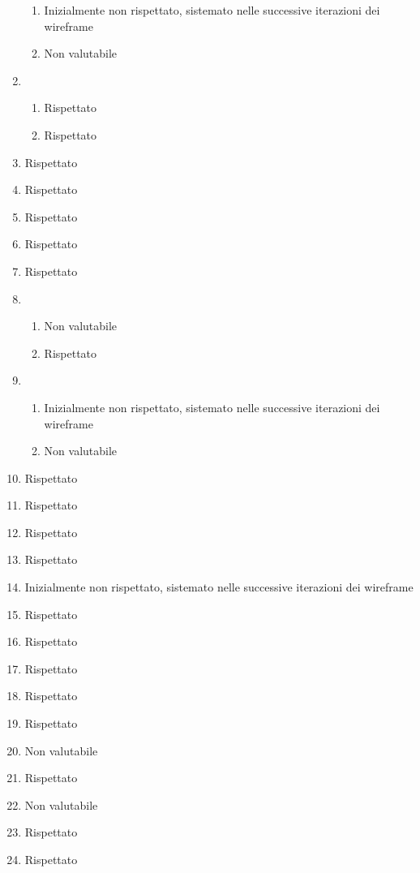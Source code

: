 \begin{enumerate}
\begin{enumerate}[label=\Alph*]
        \item Inizialmente non rispettato, sistemato nelle successive iterazioni dei wireframe
        \item Non valutabile
    \end{enumerate}
    \item \begin{enumerate}[label=\Alph*]
        \item Rispettato
        \item Rispettato
    \end{enumerate}
    \item Rispettato
    \item Rispettato
    \item Rispettato
    \item Rispettato
    \item Rispettato
    \item \begin{enumerate}[label=\Alph*]
        \item Non valutabile
        \item Rispettato
    \end{enumerate}
    \item \begin{enumerate}[label=\Alph*]
        \item Inizialmente non rispettato, sistemato nelle successive iterazioni dei wireframe
        \item Non valutabile
    \end{enumerate}
    \item Rispettato
    \item Rispettato
    \item Rispettato
    \item Rispettato
    \item Inizialmente non rispettato, sistemato nelle successive iterazioni dei wireframe
    \item Rispettato
    \item Rispettato
    \item Rispettato
    \item Rispettato
    \item Rispettato
    \item Non valutabile
    \item Rispettato
    \item Non valutabile
    \item Rispettato
    \item Rispettato
\end{enumerate}